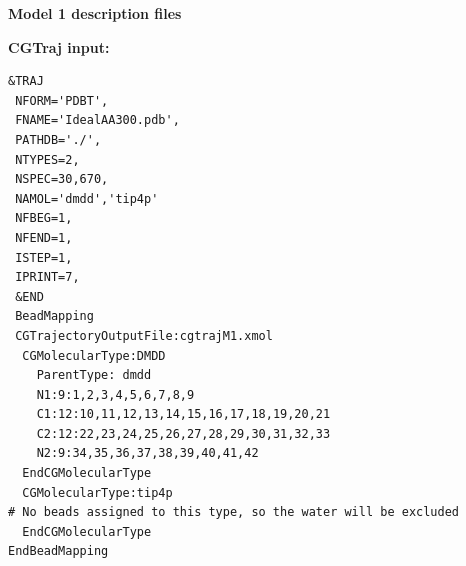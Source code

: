 \documentclass[10pt,a4paper,twoside]{article}
\begin{document}
%

\textbf{Model 1 description files}

\textbf{CGTraj input:}
\begin{lstlisting}[frame=single]
 &TRAJ
 NFORM='PDBT',
 FNAME='IdealAA300.pdb',
 PATHDB='./',
 NTYPES=2,
 NSPEC=30,670,
 NAMOL='dmdd','tip4p'
 NFBEG=1,
 NFEND=1,
 ISTEP=1,
 IPRINT=7,
 &END
 BeadMapping
 CGTrajectoryOutputFile:cgtrajM1.xmol
  CGMolecularType:DMDD
    ParentType: dmdd
    N1:9:1,2,3,4,5,6,7,8,9
    C1:12:10,11,12,13,14,15,16,17,18,19,20,21
    C2:12:22,23,24,25,26,27,28,29,30,31,32,33
    N2:9:34,35,36,37,38,39,40,41,42
  EndCGMolecularType 
  CGMolecularType:tip4p
# No beads assigned to this type, so the water will be excluded
  EndCGMolecularType 
EndBeadMapping
\end{lstlisting}
\end{document}
